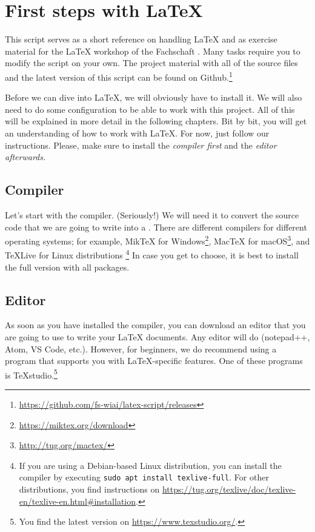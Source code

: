 \newpage
{}
\pagecolor{latexblue}

\chapter*{First steps with \LaTeX}

This script serves as a short reference on handling \LaTeX{} and as exercise material for the \LaTeX{} workshop of the Fachschaft .
Many tasks require you to modify the script on your own.
The project material with all of the source files and the latest version of this script can be found on Github.\footnote{\url{https://github.com/fs-wiai/latex-script/releases}}

Before we can dive into \LaTeX{}, we will obviously have to install it.
We will also need to do some configuration to be able to work with this project.
All of this will be explained in more detail in the following chapters.
Bit by bit, you will get an understanding of how to work with \LaTeX{}.
For now, just follow our instructions.
Please, make sure to install the \emph{compiler first} and the \emph{editor afterwards}\textit{.}

\section*{Compiler}
Let’s start with the compiler.
(Seriously!)
We will need it to convert the source code that we are going to write into a .
There are different compilers for different operating systems;
for example, MikTeX for Windows\footnote{\url{https://miktex.org/download}}, Mac\TeX{} for macOS\footnote{\url{http://tug.org/mactex/}}, and \TeX{}Live for Linux distributions
\footnote{If you are using a Debian-based Linux distribution, you can install the compiler by executing \texttt{sudo apt install texlive-full}.
For other distributions, you find instructions on \url{https://tug.org/texlive/doc/texlive-en/texlive-en.html\#installation}.} 
In case you get to choose, it is best to install the full version with all packages.

\section*{Editor}
As soon as you have installed the compiler, you can download an editor that you are going to use to write your \LaTeX{} documents.
Any editor will do (notepad++, Atom, VS Code, etc.).
However, for beginners, we do recommend using a program that supports you with \LaTeX-specific features.
One of these programs is \TeX{}studio.\footnote{You find the latest version on \url{https://www.texstudio.org/}.}

